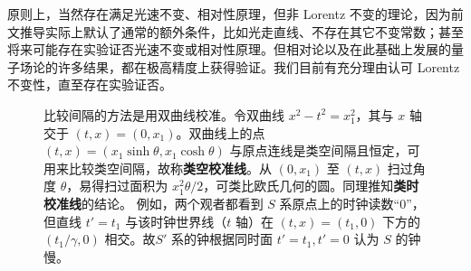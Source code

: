 原则上，当然存在满足光速不变、相对性原理，但非 Lorentz 不变的理论，因为前文推导实际上默认了通常的额外条件，比如光走直线、不存在其它不变常数；甚至将来可能存在实验证否光速不变或相对性原理。但相对论以及在此基础上发展的量子场论的许多结果，都在极高精度上获得验证。我们目前有充分理由认可 Lorentz 不变性，直至存在实验证否。

\newpage
\begin{figure}[!h]
    \centering
    \caption{\small 比较间隔的方法是用双曲线校准。令双曲线 $x^2-t^2=x_1^2$，其与 $x$ 轴交于 $\left(t,x\right)=(0,x_1)$。双曲线上的点 $(t,x)=(x_1\sinh\theta, x_1\cosh\theta)$ 与原点连线是类空间隔且恒定，可用来比较类空间隔，故称\textbf{类空校准线}。从 $(0,x_1)$ 至 $(t,x)$ 扫过角度 $\theta$，易得扫过面积为 $x_1^2\theta/2$，可类比欧氏几何的圆。同理推知\textbf{类时校准线}的结论。
    例如，两个观者都看到 $S$ 系原点上的时钟读数“0”，但直线 $t'=t_1$ 与该时钟世界线（$t$ 轴）在 $\left(t,x\right)=(t_1,0)$ 下方的 $(t_1/\gamma,0)$ 相交。故$S'$ 系的钟根据同时面 $t'=t_1,t'=0$ 认为 $S$ 的钟慢。}
\end{figure}
